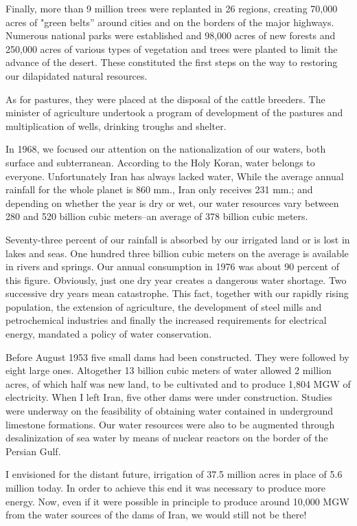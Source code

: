 Finally, more than 9 million trees were replanted in 26 regions, creating 70,000 acres of "green belts” around cities and on the borders of the major highways. Numerous national parks were established and 98,000 acres of new forests and 250,000 acres of various types of vegetation and trees were planted to limit the advance of the desert. These constituted the first steps on the way to restoring our dilapidated natural resources. 

As for pastures, they were placed at the disposal of the cattle breeders. The minister of agriculture undertook a program of development of the pastures and multiplication of wells, drinking troughs and shelter. 

In 1968, we focused our attention on the nationalization of our waters, both surface and subterranean. According to the Holy Koran, water belongs to everyone. Unfortunately Iran has always lacked water, While the average annual rainfall for the whole planet is 860 mm., Iran only receives 231 mm.; and depending on whether the year is dry or wet, our water resources vary between 280 and 520 billion cubic meters--an average of 378 billion cubic meters. 


Seventy-three percent of our rainfall is absorbed by our irrigated land or is lost in lakes and seas. One hundred three billion cubic meters on the average is available in rivers and springs. Our annual consumption in 1976 was about 90 percent of this figure. Obviously, just one dry year creates a dangerous water shortage. Two successive dry years mean catastrophe. This fact, together with our rapidly rising population, the extension of agriculture, the development of steel mills and petrochemical industries and finally the increased requirements for electrical energy, mandated a policy of water conservation. 

Before August 1953 five small dams had been constructed. They were followed by eight large ones. Altogether 13 billion cubic meters of water allowed 2 million acres, of which half was new land, to be cultivated and to produce 1,804 MGW of electricity. When I left Iran, five other dams were under construction. Studies were underway on the feasibility of obtaining water contained in underground limestone formations. Our water resources were also to be augmented through desalinization of sea water by means of nuclear reactors on the border of the Persian Gulf. 

I envisioned for the distant future, irrigation of 37.5 million acres in place of 5.6 million today. In order to achieve this end it was necessary to produce more energy. Now, even if it were possible in principle to produce around 10,000 MGW from the water sources of the dams of Iran, we would still not be there! 

